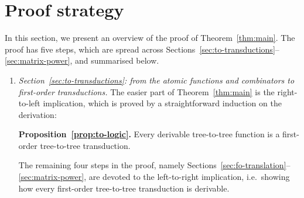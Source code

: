 \section{Proof strategy}
\label{sec:strategy}
In this section, we present an overview of the proof of Theorem~\ref{thm:main}. The proof has five steps, which are spread across Sections~\ref{sec:to-transductions}--\ref{sec:matrix-power}, and summarised below.

\newcommand{\announce}[2]{
\begin{center}
    {\bf #1.} #2
\end{center}
}
\begin{enumerate}
\item \emph{Section~\ref{sec:to-transductions}: from the atomic functions and combinators to first-order transductions.} The easier part of Theorem~\ref{thm:main} is the  right-to-left implication, which is proved by a straightforward induction on the derivation:
\announce
{Proposition~\ref{prop:to-logic}}
{Every derivable tree-to-tree function is a first-order tree-to-tree transduction.}
 
 The remaining four steps in the proof, namely Sections~\ref{sec:fo-translation}--\ref{sec:matrix-power}, are devoted to the left-to-right implication, i.e.~showing how every first-order tree-to-tree transduction  is  derivable.


\end{enumerate}
